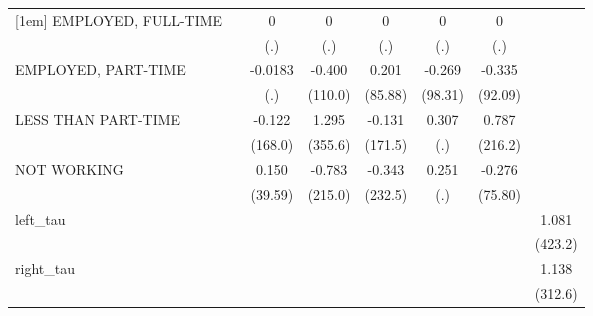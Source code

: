 {\begin{tabular}{l*{7}{c}}
[1em]
EMPLOYED, FULL-TIME           &                   &         0         &         0         &         0         &         0         &         0         &                   \\
                              &                   &       (.)         &       (.)         &       (.)         &       (.)         &       (.)         &                   \\
[1em]
EMPLOYED, PART-TIME           &                   &   -0.0183         &    -0.400         &     0.201         &    -0.269         &    -0.335         &                   \\
                              &                   &       (.)         &   (110.0)         &   (85.88)         &   (98.31)         &   (92.09)         &                   \\
[1em]
LESS THAN PART-TIME           &                   &    -0.122         &     1.295         &    -0.131         &     0.307         &     0.787         &                   \\
                              &                   &   (168.0)         &   (355.6)         &   (171.5)         &       (.)         &   (216.2)         &                   \\
[1em]
NOT WORKING                   &                   &     0.150         &    -0.783         &    -0.343         &     0.251         &    -0.276         &                   \\
                              &                   &   (39.59)         &   (215.0)         &   (232.5)         &       (.)         &   (75.80)         &                   \\
[1em]
left\_tau                      &                   &                   &                   &                   &                   &                   &     1.081         \\
                              &                   &                   &                   &                   &                   &                   &   (423.2)         \\
[1em]
right\_tau                     &                   &                   &                   &                   &                   &                   &     1.138         \\
                              &                   &                   &                   &                   &                   &                   &   (312.6)         \\
[1em]

\end{tabular}}
